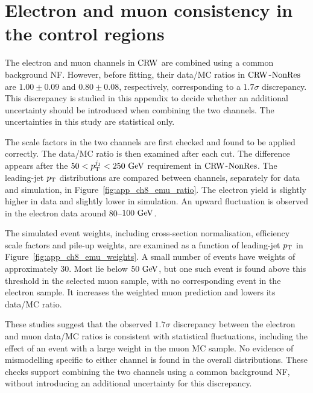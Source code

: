 \chapter{Electron and muon consistency in the control regions}
\label{app:ch8_emu}

The electron and muon channels in $\mathrm{CRW}$ are combined using a common background NF. However, before fitting, their data/MC ratios in $\mathrm{CRW}$-$\mathrm{NonRes}$ are $1.00\pm0.09$ and $0.80\pm0.08$, respectively, corresponding to a $1.7\sigma$ discrepancy. This discrepancy is studied in this appendix to decide whether an additional uncertainty should be introduced when combining the two channels. The uncertainties in this study are statistical only.

The scale factors in the two channels are first checked and found to be applied correctly.
The data/MC ratio is then examined after each cut.
The difference appears after the $50<p_{\mathrm{T}}^{j_1}<250~\mathrm{GeV}$ requirement in $\mathrm{CRW}$-$\mathrm{NonRes}$.
The leading-jet $p_{\mathrm{T}}$ distributions are compared between channels, separately for data and simulation, in Figure~\ref{fig:app_ch8_emu_ratio}.
The electron yield is slightly higher in data and slightly lower in simulation.
An upward fluctuation is observed in the electron data around $80$--$100~\mathrm{GeV}$.

The simulated event weights, including cross-section normalisation, efficiency scale factors and pile-up weights, are examined as a function of leading-jet $p_{\mathrm{T}}$ in Figure~\ref{fig:app_ch8_emu_weights}.
A small number of events have weights of approximately 30.
Most lie below $50~\mathrm{GeV}$, but one such event is found above this threshold in the selected muon sample, with no corresponding event in the electron sample.
It increases the weighted muon prediction and lowers its data/MC ratio.

These studies suggest that the observed $1.7\sigma$ discrepancy between the electron and muon data/MC ratios is consistent with statistical fluctuations, including the effect of an event with a large weight in the muon MC sample. No evidence of mismodelling specific to either channel is found in the overall distributions. These checks support combining the two channels using a common background NF, without introducing an additional uncertainty for this discrepancy.


